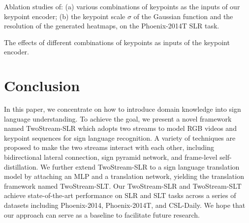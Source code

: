 \documentclass{article}
\begin{document}
\begin{table}[t]
    \caption{Ablation studies of: (a) various combinations of keypoints as the inputs of our keypoint encoder; (b) the keypoint scale $\sigma$ of the Gaussian function and the resolution of the generated heatmaps, on the Phoenix-2014T SLR task.}
    \centering
    \begin{subtable}[b]{0.68\textwidth}
\centering
    \caption{The effects of different combinations of keypoints as inputs of the keypoint encoder.}
\label{tab:keypoint_comb}
    \end{subtable}
    \hfill
    \begin{subtable}[b]{0.3\textwidth}
\centering
    \caption{Keypoint scale $\sigma$ and heatmap resolution.}
\label{tab:heatmap_input}
    \end{subtable}
\end{table} \section{Conclusion}
In this paper, we concentrate on how to introduce domain knowledge into sign language understanding. To achieve the goal, we present a novel framework named TwoStream-SLR which adopts two streams to model RGB videos and keypoint sequences for sign language recognition. A variety of techniques are proposed to make the two streams interact with each other, including bidirectional lateral connection, sign pyramid network, and frame-level self-distillation. We further extend TwoStream-SLR to a sign language translation model by attaching an MLP and a translation network, yielding the translation framework named TwoStream-SLT. Our TwoStream-SLR and TwoStream-SLT achieve state-of-the-art performance on SLR and SLT tasks across a series of datasets including Phoenix-2014, Phoenix-2014T, and CSL-Daily. We hope that our approach can serve as a baseline to facilitate future research.
\end{document}
